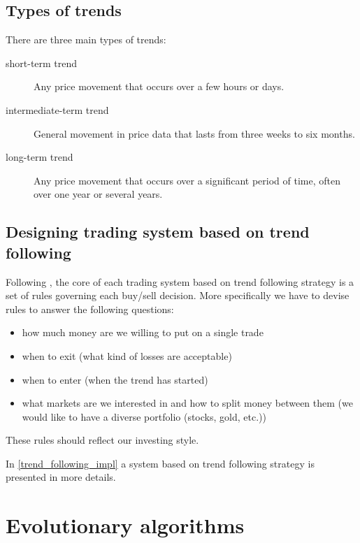 \subsection{Types of trends}

There are three main types of trends:

\begin{description}
  \item [short-term trend]
      Any price movement that occurs over a few hours or days.
  \item [intermediate-term trend]
      General movement in price data that lasts from three weeks to six months.
  \item [long-term trend]
      Any price movement that occurs over a significant period of time, often over one year or several years.
\end{description}



\subsection{Designing trading system based on trend following} 

Following \cite{Trend01}, the core of each trading system based on trend following strategy is a set of rules governing each buy/sell decision.
More specifically we have to devise rules to answer the following questions:

\begin{itemize}
  \item how much money are we willing to put on a single trade
  \item when to exit (what kind of losses are acceptable)
  \item when to enter (when the trend has started) 
  \item what markets are we interested in and how to split money between them (we would like to have a diverse portfolio (stocks, gold, etc.))
\end{itemize}

These rules should reflect our investing style.

In \ref{trend_following_impl} a system based on trend following strategy is presented in more details.


\section{Evolutionary algorithms}
\label{sec:evolAlgorithms}


